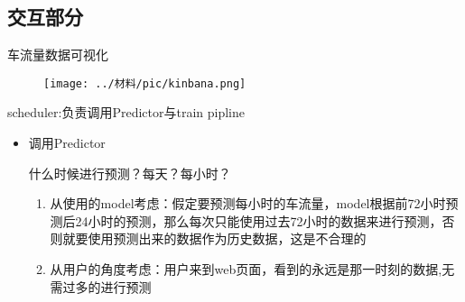 \documentclass[notheorems, aspectratio=1610]{beamer}
\begin{document}
\subsection{交互部分}
\begin{frame}
    \large 车流量数据可视化
    \begin{figure}[h] %
        \centering %
        \texttt{[image: ../材料/pic/kinbana.png]} %
    \end{figure}%
\end{frame}
\begin{frame}
    scheduler:负责调用Predictor与train pipline
    \begin{itemize}
        \item 调用Predictor\par
        \small 什么时候进行预测？每天？每小时？
        \begin{enumerate}
            \item 从使用的model考虑：假定要预测每小时的车流量，model根据前72小时预测后24小时的预测，那么每次只能使用过去72小时的数据来进行预测，否则就要使用预测出来的数据作为历史数据，这是不合理的
            \item 从用户的角度考虑：用户来到web页面，看到的永远是那一时刻的数据,无需过多的进行预测
        \end{enumerate}
        
        
        
    \end{itemize}
    
\end{frame}
\end{document}
